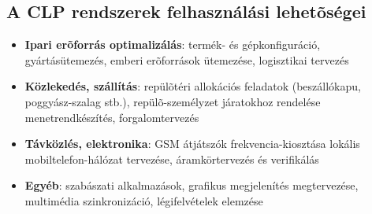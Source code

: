 
\subsection{A CLP rendszerek felhasználási lehetõségei}

\begin{itemize}
\item {\bf Ipari erõforrás optimalizálás}: termék- és gépkonfiguráció,
gyártásütemezés, emberi erõforrások ütemezése, logisztikai tervezés

\item {\bf Közlekedés, szállítás}: repülõtéri allokációs feladatok
(beszállókapu, poggyász-szalag stb.), repülõ-személyzet járatokhoz rendelése
menetrendkészítés, forgalomtervezés

\item {\bf Távközlés, elektronika}: GSM átjátszók frekvencia-kiosztása
lokális mobiltelefon-hálózat tervezése, áramkörtervezés és verifikálás

\item {\bf Egyéb}: szabászati alkalmazások, grafikus megjelenítés megtervezése,
multimédia szinkronizáció, légifelvételek elemzése
\end{itemize}
